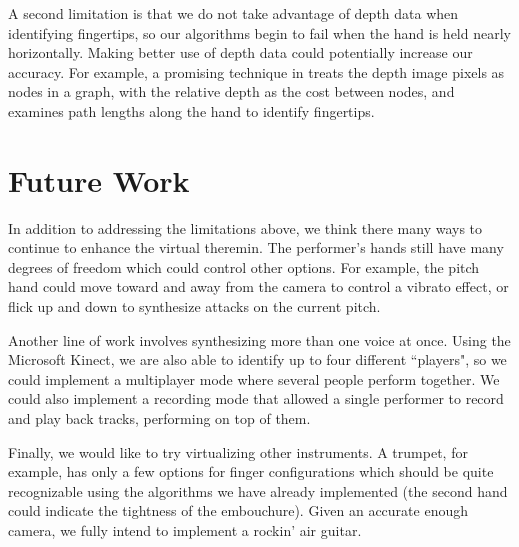 \documentclass[12pt]{article}
\begin{document}
A second limitation is that we do not take advantage of depth data when identifying fingertips, so our algorithms begin to fail when the hand is held nearly horizontally.  Making better use of depth data could potentially increase our accuracy.  For example, a promising technique in \cite{Lia12} treats the depth image pixels as nodes in a graph, with the relative depth as the cost between nodes, and examines path lengths along the hand to identify fingertips.



\section{Future Work}
In addition to addressing the limitations above, we think there many ways to continue to enhance the virtual theremin.  The performer's hands still have many degrees of freedom which could control other options.  For example, the pitch hand could move toward and away from the camera to control a vibrato effect, or flick up and down to synthesize attacks on the current pitch.

Another line of work involves synthesizing more than one voice at once.  Using the Microsoft Kinect, we are also able to identify up to four different ``players", so we could implement a multiplayer mode where several people perform together.  We could also implement a recording mode that allowed a single performer to record and play back tracks, performing on top of them.

Finally, we would like to try virtualizing other instruments.  A trumpet, for example, has only a few options for finger configurations which should be quite recognizable using the algorithms we have already implemented (the second hand could indicate the tightness of the embouchure).  Given an accurate enough camera, we fully intend to implement a rockin' air guitar.
\end{document}
